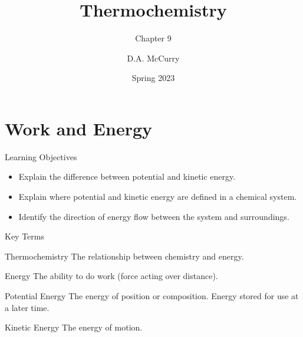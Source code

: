 \documentclass[notes=only]{beamer}
\title{Thermochemistry}
\subtitle{Chapter 9}
\institute{CHEM115 --- Chemistry for the Sciences I \\ Bloomsburg University}
\author{D.A. McCurry}
\date{Spring 2023}
\begin{document}
\maketitle

\section{Work and Energy}

\begin{frame}{Learning Objectives}
	\begin{itemize}
	\item Explain the difference between potential and kinetic energy.
	\item Explain where potential and kinetic energy are defined in a chemical
	system.
	\item Identify the direction of energy flow between the system and surroundings.
	\end{itemize}
\end{frame}

\begin{frame}{Key Terms}
	\begin{block}{Thermochemistry}
		The relationship between chemistry and energy.
	\end{block}

	\begin{block}{Energy}
		The ability to do \alert{work} (force acting over distance).
	\end{block}

	\begin{block}{Potential Energy}
		The energy of position or composition. Energy stored for use at
		a later time.
	\end{block}           

	\begin{block}{Kinetic Energy}
		The energy of motion.
	\end{block}
\end{frame}
\end{document}
